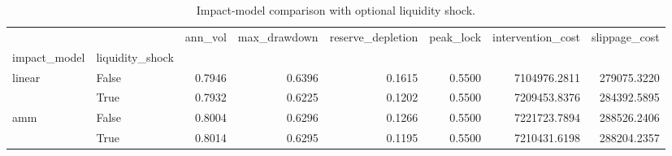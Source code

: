 \begin{table}
\caption{Impact-model comparison with optional liquidity shock.}
\label{tab:impact}
\begin{tabular}{llrrrrrr}
\toprule
 &  & ann_vol & max_drawdown & reserve_depletion & peak_lock & intervention_cost & slippage_cost \\
impact_model & liquidity_shock &  &  &  &  &  &  \\
\midrule
\multirow[t]{2}{*}{linear} & False & 0.7946 & 0.6396 & 0.1615 & 0.5500 & 7104976.2811 & 279075.3220 \\
 & True & 0.7932 & 0.6225 & 0.1202 & 0.5500 & 7209453.8376 & 284392.5895 \\
\cline{1-8}
\multirow[t]{2}{*}{amm} & False & 0.8004 & 0.6296 & 0.1266 & 0.5500 & 7221723.7894 & 288526.2406 \\
 & True & 0.8014 & 0.6295 & 0.1195 & 0.5500 & 7210431.6198 & 288204.2357 \\
\cline{1-8}
\bottomrule
\end{tabular}
\end{table}
